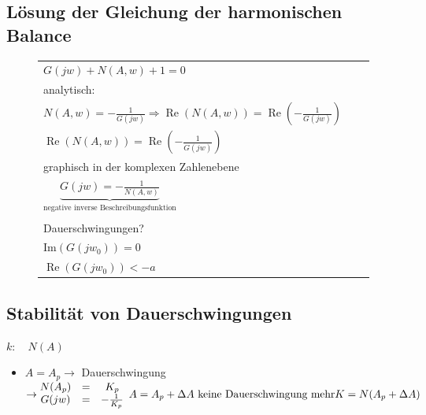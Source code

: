 \documentclass[11pt,a4paper]{article}
\begin{document}
\subsection{Lösung der Gleichung der harmonischen Balance}
\begin{figure}[htbp]
\begin{minipage}[c]{9.0cm}
\def\svgwidth{250pt} 
 
\end{minipage}
\begin{minipage}[c]{7cm}

\begin{tabular}{lll}
$G(jw) + N(A,w) +1 = 0$&&\\
analytisch:&&\\
$N(A,w) = -\frac{1}{G(jw)} \Rightarrow \operatorname{Re}(N(A,w)) = \operatorname{Re}(-\frac{1}{G(jw)})$ &&\\
$\operatorname{Re}(N(A,w)) = \operatorname{Re}(-\frac{1}{G(jw)})$&&\\
graphisch in der komplexen Zahlenebene &&\\
$\underbrace{G(jw) = -\frac{1}{N(A,w)}}_{\text{negative inverse Beschreibungsfunktion}}$&&\\
&&\\
Dauerschwingungen? &&\\
$\mathrm{Im}(G(jw_0)) = 0 $ &&\\
$\operatorname{Re}(G(jw_0)) < -a$ \\
\end{tabular}
\end{minipage}
\end{figure} 
\subsection{Stabilität von Dauerschwingungen}
\begin{figure}[H] 
  \centering 
  \def\svgwidth{120pt} 
   
\end{figure} 
$k: \quad N(A)$
\begin{itemize}
\item $A= A_p \rightarrow$ Dauerschwingung $\rightarrow \begin{matrix} N(A_p)& = & K_p \\G(jw) & =& -\frac{1}{K_p} \end{matrix}\\
A = A_p + \Delta A \text{  keine Dauerschwingung mehr}\\
K = N(A_p + \Delta A)$ 
\begin{figure}[H] 
  \centering 
  \def\svgwidth{350pt} 
   
\end{figure} 
\end{itemize}
\end{document}
